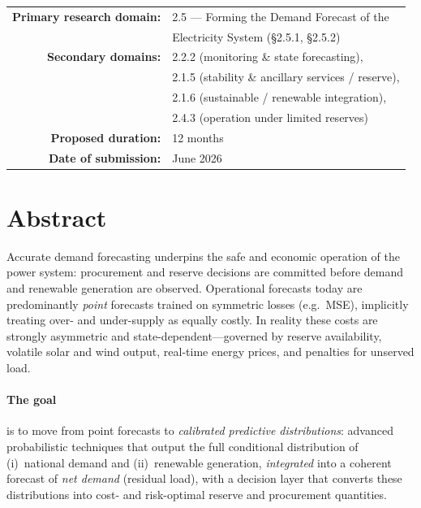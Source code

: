 \documentclass[12pt,a4paper]{article}
\begin{document}
\begin{center}
    \vspace{0.9cm}
    \begin{tabular}{rl}
        \textbf{Primary research domain:} & 2.5 --- Forming the Demand Forecast of the \\
                                          & \phantom{2.5 --- }Electricity System (\S2.5.1, \S2.5.2) \\[0.35em]
        \textbf{Secondary domains:}       & 2.2.2 (monitoring \& state forecasting),\\
                                          & 2.1.5 (stability \& ancillary services / reserve),\\
                                          & 2.1.6 (sustainable / renewable integration),\\
                                          & 2.4.3 (operation under limited reserves) \\[0.35em]
        \textbf{Proposed duration:}       & 12 months \\[0.35em]
        \textbf{Date of submission:}      & June 2026 \\
    \end{tabular}
\end{center}
\endgroup
\newpage

\section*{Abstract}

Accurate demand forecasting underpins the safe and economic operation of the power
system: procurement and reserve decisions are committed before demand and renewable
generation are observed. Operational forecasts today are predominantly \emph{point}
forecasts trained on symmetric losses (e.g.\ MSE), implicitly treating over- and
under-supply as equally costly. In reality these costs are strongly asymmetric and
state-dependent---governed by reserve availability, volatile solar and wind output,
real-time energy prices, and penalties for unserved load.

\paragraph{The goal} is to move from point forecasts to \emph{calibrated predictive
distributions}: advanced probabilistic techniques that output the full conditional
distribution of (i)~national demand and (ii)~renewable generation, \emph{integrated} into
a coherent forecast of \emph{net demand} (residual load), with a decision layer that
converts these distributions into cost- and risk-optimal reserve and procurement quantities.
\end{document}
